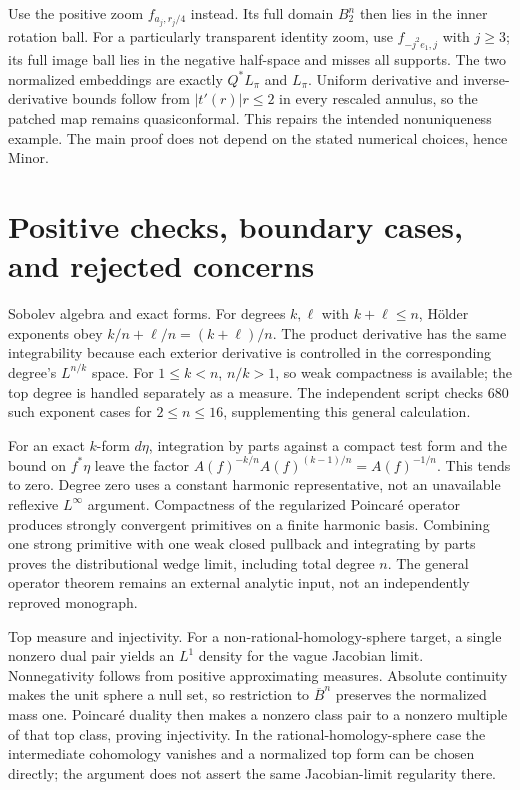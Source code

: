\documentclass[10pt]{article}
\begin{document}
Use the positive zoom \(f_{a_j,r_j/4}\) instead. Its full domain \(B_2^n\) then lies in the inner rotation ball. For a particularly transparent identity zoom, use \(f_{-j^2e_1,j}\) with \(j\ge3\); its full image ball lies in the negative half-space and misses all supports. The two normalized embeddings are exactly \(Q^*L_\pi\) and \(L_\pi\). Uniform derivative and inverse-derivative bounds follow from \(|t'(r)|r\le2\) in every rescaled annulus, so the patched map remains quasiconformal. This repairs the intended nonuniqueness example. The main proof does not depend on the stated numerical choices, hence Minor.\par
\section*{Positive checks, boundary cases, and rejected concerns}
Sobolev algebra and exact forms. For degrees \(k,\ell\) with \(k+\ell\le n\), Hölder exponents obey \(k/n+\ell/n=(k+\ell)/n\). The product derivative has the same integrability because each exterior derivative is controlled in the corresponding degree’s \(L^{n/k}\) space. For \(1\le k<n\), \(n/k>1\), so weak compactness is available; the top degree is handled separately as a measure. The independent script checks 680 such exponent cases for \(2\le n\le16\), supplementing this general calculation.\par
For an exact \(k\)-form \(d\eta\), integration by parts against a compact test form and the bound on \(f^*\eta\) leave the factor \(A(f)^{-k/n} A(f)^{(k-1)/n}=A(f)^{-1/n}\). This tends to zero. Degree zero uses a constant harmonic representative, not an unavailable reflexive \(L^\infty\) argument. Compactness of the regularized Poincaré operator produces strongly convergent primitives on a finite harmonic basis. Combining one strong primitive with one weak closed pullback and integrating by parts proves the distributional wedge limit, including total degree \(n\). The general operator theorem remains an external analytic input, not an independently reproved monograph.\par
Top measure and injectivity. For a non-rational-homology-sphere target, a single nonzero dual pair yields an \(L^1\) density for the vague Jacobian limit. Nonnegativity follows from positive approximating measures. Absolute continuity makes the unit sphere a null set, so restriction to \(\overline B^n\) preserves the normalized mass one. Poincaré duality then makes a nonzero class pair to a nonzero multiple of that top class, proving injectivity. In the rational-homology-sphere case the intermediate cohomology vanishes and a normalized top form can be chosen directly; the argument does not assert the same Jacobian-limit regularity there.\par
\end{document}
